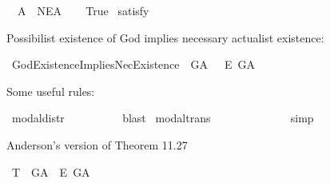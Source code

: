 \begin{isabellebody}
\ \ A{}{\isacharcolon}\ {\isachardoublequoteopen}{\isasymlfloor}{\isasymP}\ NE\isactrlsup A{\isasymrfloor}{\isachardoublequoteclose}\isanewline
\ \ \isamarkupfalse%
\ True\ \isamarkupfalse%
{\isacharbrackleft}satisfy{\isacharbrackright}%
\ %
%
\isamarkupfalse%
\ %
%
%
%
%
\begin{isamarkuptext}%
Possibilist existence of God implies necessary actualist existence:%
\end{isamarkuptext}\isamarkuptrue%
\isamarkupfalse%
\ GodExistenceImpliesNecExistence{\isacharcolon}\ {\isachardoublequoteopen}{\isasymlfloor}\isactrlbold {\isasymexists}\ G\isactrlsup A\ \isactrlbold {\isasymrightarrow}\ \ \isactrlbold {\isasymbox}\isactrlbold {\isasymexists}\isactrlsup E\ G\isactrlsup A{\isasymrfloor}{\isachardoublequoteclose}%
\ %
%
\isamarkupfalse%
\ {\isacharminus}\ %
%
%
%
%
\begin{isamarkuptext}%
Some useful rules:%
\end{isamarkuptext}\isamarkuptrue%
\isamarkupfalse%
\ modal{\isacharunderscore}distr{\isacharcolon}\ {\isachardoublequoteopen}{\isasymlfloor}\isactrlbold {\isasymbox}{\isacharparenleft}{\isasymphi}\ \isactrlbold {\isasymrightarrow}\ {\isasympsi}{\isacharparenright}{\isasymrfloor}\ {\isasymLongrightarrow}\ {\isasymlfloor}{\isacharparenleft}\isactrlbold {\isasymdiamond}{\isasymphi}\ \isactrlbold {\isasymrightarrow}\ \isactrlbold {\isasymdiamond}{\isasympsi}{\isacharparenright}{\isasymrfloor}{\isachardoublequoteclose}%
\ %
%
\isamarkupfalse%
\ blast%
%
%
\isanewline
{}\isamarkupfalse%
\ modal{\isacharunderscore}trans{\isacharcolon}\ {\isachardoublequoteopen}{\isacharparenleft}{\isasymlfloor}{\isasymphi}\ \isactrlbold {\isasymrightarrow}\ {\isasympsi}{\isasymrfloor}\ {\isasymand}\ {\isasymlfloor}{\isasympsi}\ \isactrlbold {\isasymrightarrow}\ {\isasymchi}{\isasymrfloor}{\isacharparenright}\ {\isasymLongrightarrow}\ {\isasymlfloor}{\isasymphi}\ \isactrlbold {\isasymrightarrow}\ {\isasymchi}{\isasymrfloor}{\isachardoublequoteclose}%
\ %
%
\isamarkupfalse%
\ simp%
%
%
%
\begin{isamarkuptext}%
Anderson's version of Theorem 11.27%
\end{isamarkuptext}\isamarkuptrue%
\isamarkupfalse%
\ T{}{\isacharcolon}\ {\isachardoublequoteopen}{\isasymlfloor}\isactrlbold {\isasymdiamond}\isactrlbold {\isasymexists}\ G\isactrlsup A{\isasymrfloor}\ {\isasymlongrightarrow}\ {\isasymlfloor}\isactrlbold {\isasymbox}\isactrlbold {\isasymexists}\isactrlsup E\ G\isactrlsup A{\isasymrfloor}{\isachardoublequoteclose}\isanewline

\end{isabellebody}
